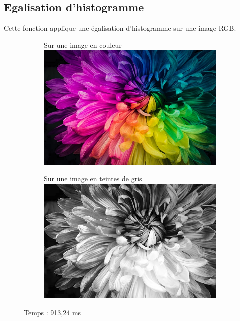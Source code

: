 \documentclass{article}
\begin{document}
\bigbreak
\subsection{Egalisation d'histogramme}
\medbreak

Cette fonction applique une égalisation d'histogramme sur une image RGB.
\medbreak

\begin{figure}[h!]
    \centering
    \begin{subfigure}[b]{0.4\linewidth}
        Sur une image en couleur
        \medbreak
        \includegraphics[width=\linewidth]{./Images/Multicolor/Color_Egalisation.jpg}
    \end{subfigure}
    \begin{subfigure}[b]{0.4\linewidth}
        Sur une image en teintes de gris
        \medbreak
        \includegraphics[width=\linewidth]{./Images/Multicolor/Gray_Egalisation.jpg}
    \end{subfigure}
    \bigbreak
    Temps  : 913,24 ms
\end{figure}
\end{document}
